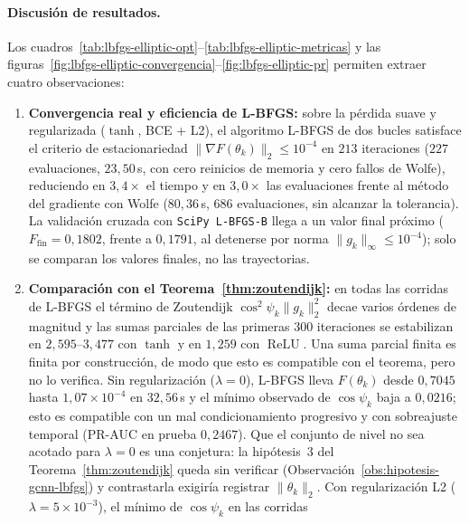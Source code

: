 \documentclass[a4paper,openany,oneside,10pt]{report}
\theoremstyle{pnlTeorema}
\theoremstyle{pnlDefinicion}
\theoremstyle{pnlObservacion}
\begin{document}
\paragraph{Discusión de resultados.}
Los cuadros~\ref{tab:lbfgs-elliptic-opt}--\ref{tab:lbfgs-elliptic-metricas} y
las figuras~\ref{fig:lbfgs-elliptic-convergencia}--\ref{fig:lbfgs-elliptic-pr}
permiten extraer cuatro observaciones:
\begin{enumerate}
\item \textbf{Convergencia real y eficiencia de L-BFGS:} sobre la pérdida suave
y regularizada ($\tanh$, BCE + L2), el algoritmo L-BFGS de dos bucles satisface
el criterio de estacionariedad $\|\nabla F(\theta_k)\|_2\le 10^{-4}$ en $213$
iteraciones ($227$ evaluaciones, $23{,}50\,$s, con cero reinicios de memoria y
cero fallos de Wolfe), reduciendo en $3{,}4\times$ el tiempo y en $3{,}0\times$
las evaluaciones frente al método del gradiente con Wolfe ($80{,}36\,$s, $686$
evaluaciones, sin alcanzar la tolerancia). La validación cruzada con
\texttt{SciPy L-BFGS-B} llega a un valor final próximo ($F_{\mathrm{fin}}=0{,}1802$, frente a $0{,}1791$,
al detenerse por norma $\|g_k\|_\infty\le 10^{-4}$); solo se comparan los valores finales, no las trayectorias.
\item \textbf{Comparación con el Teorema~\ref{thm:zoutendijk}:} en todas
las corridas de L-BFGS el término de Zoutendijk $\cos^2\psi_k\|g_k\|_2^2$ decae
varios órdenes de magnitud y las sumas parciales de las primeras $300$ iteraciones
se estabilizan en $2{,}595$--$3{,}477$ con $\tanh$ y en $1{,}259$ con $\operatorname{ReLU}$.
Una suma parcial finita es finita por construcción, de modo que esto es compatible
con el teorema, pero no lo verifica. Sin
regularización ($\lambda=0$), L-BFGS lleva $F(\theta_k)$ desde $0{,}7045$ hasta
$1{,}07\times 10^{-4}$ en $32{,}56\,$s y el mínimo observado de $\cos\psi_k$ baja a $0{,}0216$;
esto es compatible con un mal condicionamiento progresivo y con sobreajuste temporal
(PR-AUC en prueba $0{,}2467$). Que el conjunto de nivel no sea acotado para $\lambda=0$
es una conjetura: la hipótesis~3 del Teorema~\ref{thm:zoutendijk} queda sin verificar
(Observación~\ref{obs:hipotesis-gcnn-lbfgs}) y contrastarla exigiría registrar $\|\theta_k\|_2$.
Con regularización L2 ($\lambda=5\times 10^{-3}$), el mínimo de $\cos\psi_k$ en las corridas

\end{enumerate}
\end{document}
